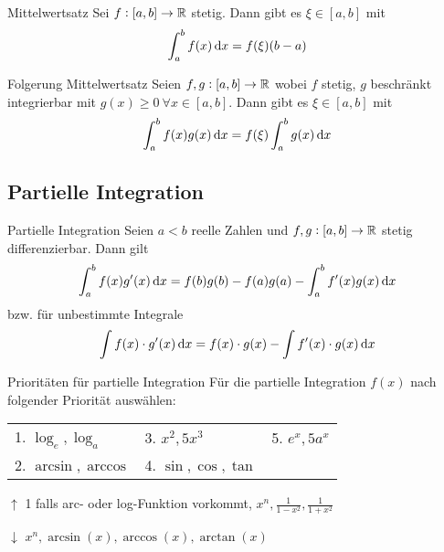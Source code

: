 \begin{theorem}[important]{Mittelwertsatz}
    Sei $f:[a,b] \to \mathbb{R}$ stetig.
    Dann gibt es $\xi \in [a,b]$ mit
    \begin{equation}
        \int_{a}^{b} f(x) \dif x = f(\xi)(b-a)
    \end{equation}
\end{theorem}

\begin{theorem}{Folgerung Mittelwertsatz}
    Seien $f,g: [a,b] \to \mathbb{R}$ wobei $f$ stetig, $g$ beschränkt integrierbar mit $g(x) \geq 0~\forall x \in [a,b]$.
    Dann gibt es $\xi \in [a,b]$ mit
    \begin{equation}
        \int_{a}^{b} f(x)g(x) \dif x = f(\xi) \int_{a}^{b} g(x) \dif x
    \end{equation}
\end{theorem}

\subsection{Partielle Integration}

\begin{concept}{Partielle Integration}
    Seien $a < b$ reelle Zahlen und $f,g:[a,b] \to \mathbb{R}$ stetig differenzierbar. Dann gilt
    \begin{equation}
        \int_a^b f(x) g'(x) \dif x = f(b) g(b) - f(a) g(a) - \int_a^b f'(x)g(x) \dif x
    \end{equation}
    bzw. für unbestimmte Integrale
    \begin{equation}
        \int f(x) \cdot g'(x) \dif x = f(x) \cdot g(x) - \int f'(x) \cdot g(x) \dif x
    \end{equation}
\end{concept}

\begin{KR}{Prioritäten für partielle Integration}
    Für die partielle Integration $f(x)$ nach folgender Priorität auswählen:
    \begin{center}
    \begin{tabular}{lll}
        1. $\log_e, \log_a$  &  3. $x^2, 5x^3$ & 5. $e^x, 5a^x$\\
        2. $\arcsin, \arccos$ & 4. $\sin, \cos, \tan$ &
    \end{tabular}
    \end{center}
\end{KR}

\begin{remark}
    $\uparrow$ 1 falls arc- oder log-Funktion vorkommt, $x^{n}, \frac{1}{1-x^{2}}, \frac{1}{1+x^{2}}$

    $\downarrow$ $x^{n}, \arcsin (x), \arccos (x), \arctan (x)$
\end{remark}

